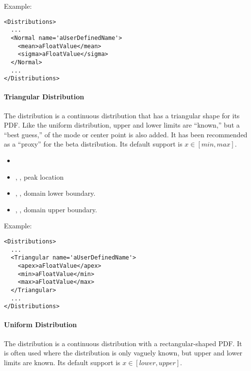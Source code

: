Example:
\begin{lstlisting}[style=XML]
<Distributions>
  ...
  <Normal name='aUserDefinedName'>
    <mean>aFloatValue</mean>
    <sigma>aFloatValue</sigma>
  </Normal>
  ...
</Distributions>
\end{lstlisting}

\paragraph{Triangular Distribution}
\label{Triangular}
The  distribution is a continuous distribution that has a
triangular shape for its PDF.
%
%
Like the uniform distribution, upper and lower limits are ``known,'' but a
``best guess,'' of the mode or center point is also added.
%
It has been recommended as a ``proxy'' for the beta distribution.
%
Its default support is $x \in [min,max]$.

%
\attrIntro
\vspace{-5mm}
\begin{itemize}
  \itemsep0em
  \item \nameDescription
\end{itemize}
\vspace{-5mm}
\subnodesIntro
\begin{itemize}
  \item {}, , peak location
  \item {}, , domain lower
  boundary.
  \item {}, , domain upper
  boundary.
\end{itemize}

Example:
\begin{lstlisting}[style=XML]
<Distributions>
  ...
  <Triangular name='aUserDefinedName'>
    <apex>aFloatValue</apex>
    <min>aFloatValue</min>
    <max>aFloatValue</max>
  </Triangular>
  ...
</Distributions>
\end{lstlisting}

\paragraph{Uniform Distribution}
\label{Uniform}
The  distribution is a continuous distribution with a
rectangular-shaped PDF.
%
It is often used where the distribution is only vaguely known, but upper and
lower limits are known.
%
Its default support is $x \in [lower,upper]$.


